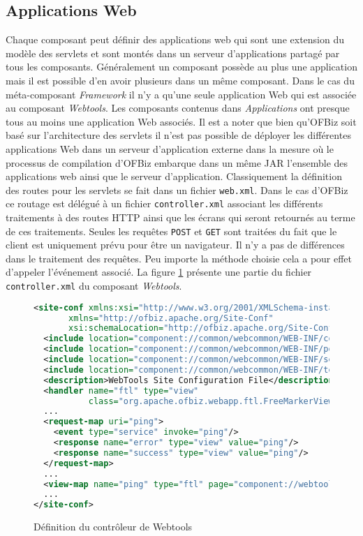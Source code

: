 \documentclass[a4paper, 11pt]{report}
\begin{document}
\subsection{Applications Web}

Chaque composant peut définir des applications web qui sont une
extension du modèle des servlets et sont montés dans un serveur
d'applications partagé par tous les composants. Généralement un
composant possède au plus une application mais il est possible d'en
avoir plusieurs dans un même composant. Dans le cas du méta-composant
\emph{Framework} il n'y a qu'une seule application Web qui est
associée au composant \emph{Webtools}. Les composants contenus dans
\emph{Applications} ont presque tous au moins une application Web
associés. Il est a noter que bien qu'OFBiz soit basé sur
l'architecture des servlets il n'est pas possible de déployer les
différentes applications Web dans un serveur d'application externe
dans la mesure où le processus de compilation d'OFBiz embarque dans un
même JAR l'ensemble des applications web ainsi que le serveur
d'application.  Classiquement la définition des routes pour les
servlets se fait dans un fichier \verb=web.xml=. Dans le cas d'OFBiz
ce routage est délégué à un fichier \verb=controller.xml= associant
les différents traitements à des routes HTTP ainsi que les écrans qui
seront retournés au terme de ces traitements. Seules les requêtes
\verb=POST= et \verb=GET= sont traitées du fait que le client est
uniquement prévu pour être un navigateur. Il n'y a pas de différences
dans le traitement des requêtes. Peu importe la méthode choisie cela a
pour effet d'appeler l'événement associé. La figure
\ref{fig:controller} présente une partie du fichier
\verb=controller.xml= du composant \emph{Webtools}.

\begin{figure}
  \begin{lstlisting}[language=xml]
<site-conf xmlns:xsi="http://www.w3.org/2001/XMLSchema-instance"
	   xmlns="http://ofbiz.apache.org/Site-Conf"
	   xsi:schemaLocation="http://ofbiz.apache.org/Site-Conf...">
  <include location="component://common/webcommon/WEB-INF/common-controller.xml"/>
  <include location="component://common/webcommon/WEB-INF/portal-controller.xml"/>
  <include location="component://common/webcommon/WEB-INF/security-controller.xml"/>
  <include location="component://common/webcommon/WEB-INF/tempexpr-controller.xml"/>
  <description>WebTools Site Configuration File</description>
  <handler name="ftl" type="view"
           class="org.apache.ofbiz.webapp.ftl.FreeMarkerViewHandler"/>
  ...
  <request-map uri="ping">
    <event type="service" invoke="ping"/>
    <response name="error" type="view" value="ping"/>
    <response name="success" type="view" value="ping"/>
  </request-map>
  ...
  <view-map name="ping" type="ftl" page="component://webtools/template/Ping.ftl"/>
  ...
</site-conf>
  \end{lstlisting}
  \caption{Définition du contrôleur de Webtools}
  \label{fig:controller}
\end{figure}
\end{document}
